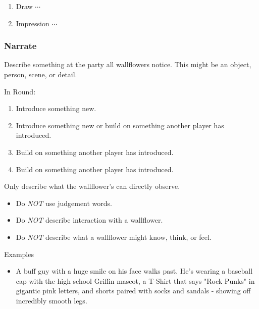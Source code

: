 \documentclass[letterpaper, 12pt]{article}
\newcommand{\vsymbolexample}{$\in$}
\newcommand{\vsymbolref}{$\cdots$}
\newcommand{\vlinkrefsectionpartynarrate}{section:partynarrate}
\newcommand{\vlinkrefsectionpartydraw}{section:partydraw}
\newcommand{\vlinkrefsectionpartyimpression}{section:partyimpression}
\newcommand{\clinkref}[1]{\label{#1}}
\newcommand{\clink}[1]{\hyperref[#1]{\vsymbolref}}
\newcommand{\cnot} {\emph{NOT} }
\begin{document}
{\begin{enumerate}[leftmargin=*]
	\item Draw \clink{\vlinkrefsectionpartydraw}


\item Impression \clink{\vlinkrefsectionpartyimpression}


\end{enumerate}


\pagebreak
\subsubsection{Narrate} \clinkref{\vlinkrefsectionpartynarrate}
Describe something at the party all wallflowers notice. This might be an object, person, scene, or detail.

\vspace{2mm}

In Round:

\begin{enumerate}
	\renewcommand{\labelenumi}{\Roman{enumi}.}
	
	\item Introduce something new.
	\item Introduce something new or build on something another player has introduced.
	\item Build on something another player has introduced.
	\item Build on something another player has introduced.
\end{enumerate}

\vspace{5mm}
Only describe what the wallflower's can directly observe.

\begin{itemize}
\item Do \cnot use judgement words.
\item Do \cnot describe interaction with a wallflower.
\item Do \cnot describe what a wallflower might know, think, or feel.
\end{itemize}

\vspace{5mm}
Examples

\begin{itemize}
\renewcommand{\labelitemi}{\vsymbolexample}

\item A buff guy with a huge smile on his face walks past. He's wearing a baseball cap with the high school Griffin mascot, a T-Shirt that says "Rock Punks" in gigantic pink letters, and shorts paired with socks and sandals - showing off incredibly smooth legs.


\end{itemize}}
\end{document}
